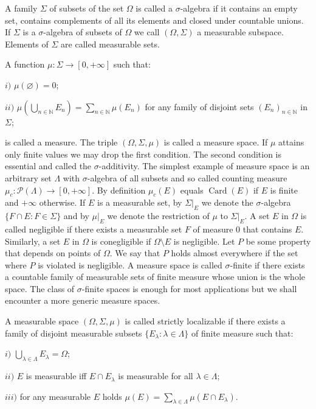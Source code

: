 A family $\Sigma$ of subsets of the set $\Omega$ is called a $\sigma$-algebra if it contains an empty set, contains complements of all its elements and closed under countable unions. If $\Sigma$ is a $\sigma$-algebra of subsets of $\Omega$ we call $(\Omega,\Sigma)$ a measurable subspace. Elements of $\Sigma$ are called measurable sets. 

A function $\mu:\Sigma\to[0,+\infty]$ such that:  

$i)$ $\mu(\varnothing)=0$; 

$ii)$ $\mu\left(\bigcup\limits_{n\in\mathbb{N}} E_n\right)=\sum\limits_{n\in\mathbb{N}}\mu(E_n)$ for any family of disjoint sets $(E_n)_{n\in\mathbb{N}}$ in $\Sigma$; 

is called a measure. The triple $(\Omega,\Sigma,\mu)$ is called a measure space. If $\mu$ attains only finite values we may drop the first condition. The second condition is essential and called the $\sigma$-additivity. The simplest example of measure space is an  arbitrary set $\Lambda$ with $\sigma$-algebra of all subsets and so called counting measure $\mu_c:\mathcal{P}(\Lambda)\to[0,+\infty]$. By definition $\mu_c(E)$ equals $\operatorname{Card}(E)$ if $E$ is finite and $+\infty$ otherwise. If $E$ is a measurable set, by $\Sigma|_E$ we denote the $\sigma$-algebra $\{F\cap E:F\in\Sigma\}$ and by $\mu|_E$ we denote the restriction of $\mu$ to $\Sigma|_E$. A set $E$ in $\Omega$ is called negligible if there exists a measurable set $F$ of measure $0$ that contains $E$. Similarly, a set $E$ in $\Omega$ is conegligible if $\Omega\setminus E$ is negligible. Let $P$ be some property that depends on points of $\Omega$. We say that $P$ holds almost everywhere if the set where $P$ is violated is negligible. A measure space is called $\sigma$-finite if there exists a countable family of measurable sets of finite measure whose union is the whole space. The class of $\sigma$-finite spaces is enough for most applications but we shall encounter a more generic measure spaces.

A measurable space $(\Omega,\Sigma,\mu)$ is called strictly localizable if there exists a  family of disjoint measurable subsets $\{E_\lambda:\lambda\in\Lambda\}$ of finite measure such that: 

$i)$ $\bigcup_{\lambda\in\Lambda}E_\lambda=\Omega$;

$ii)$ $E$ is measurable iff $E\cap E_\lambda$ is measurable for all $\lambda\in\Lambda$;

$iii)$ for any measurable $E$ holds $\mu(E)=\sum_{\lambda\in\Lambda}\mu(E\cap E_\lambda)$. 
  

